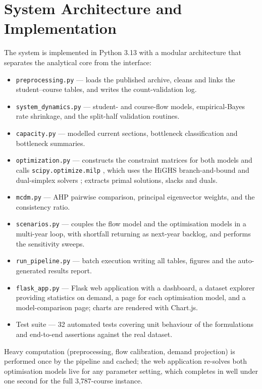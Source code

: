 \documentclass[conference]{IEEEtran}
\begin{document}
\section{System Architecture and Implementation}

The system is implemented in Python 3.13 with a modular architecture that separates the
analytical core from the interface:

\begin{itemize}
\item \texttt{preprocessing.py} --- loads the published archive, cleans and links the
      student--course tables, and writes the count-validation log.
\item \texttt{system\_dynamics.py} --- student- and course-flow models, empirical-Bayes
      rate shrinkage, and the split-half validation routines.
\item \texttt{capacity.py} --- modelled current sections, bottleneck classification and
      bottleneck summaries.
\item \texttt{optimization.py} --- constructs the constraint matrices for both models and
      calls \texttt{scipy.optimize.milp} \cite{scipy}, which uses the HiGHS branch-and-bound and
      dual-simplex solvers \cite{highs}; extracts primal solutions, slacks and duals.
\item \texttt{mcdm.py} --- AHP pairwise comparison, principal eigenvector weights, and
      the consistency ratio.
\item \texttt{scenarios.py} --- couples the flow model and the optimisation models in a
      multi-year loop, with shortfall returning as next-year backlog, and performs the
      sensitivity sweeps.
\item \texttt{run\_pipeline.py} --- batch execution writing all tables, figures and the
      auto-generated results report.
\item \texttt{flask\_app.py} --- Flask web application with a dashboard, a dataset
      explorer providing statistics on demand, a page for each optimisation model, and a
      model-comparison page; charts are rendered with Chart.js.
\item Test suite --- 32 automated tests covering unit behaviour of the formulations and
      end-to-end assertions against the real dataset.
\end{itemize}

Heavy computation (preprocessing, flow calibration, demand projection) is performed once
by the pipeline and cached; the web application re-solves both optimisation models live
for any parameter setting, which completes in well under one second for the full
3{,}787-course instance.
\end{document}
